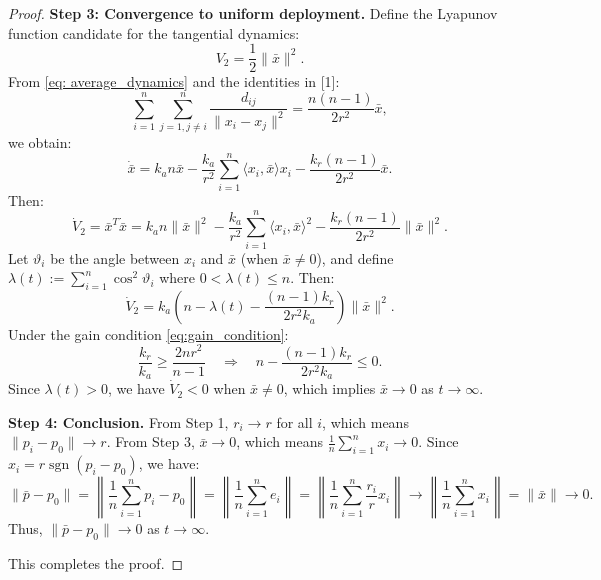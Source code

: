 \documentclass{ctexart}
\DeclareMathOperator{\sgn}{sgn}
\begin{document}
\begin{proof}
\textbf{Step 3: Convergence to uniform deployment.}
Define the Lyapunov function candidate for the tangential dynamics:
\begin{equation}
V_2 = \frac{1}{2} \|\bar{x}\|^2.
\end{equation}
From \eqref{eq: average_dynamics} and the identities in [1]:
\begin{equation}
\sum_{i=1}^{n} \sum_{j=1, j \neq i}^{n} \frac{d_{ij}}{\|x_i - x_j\|^2} = \frac{n(n-1)}{2r^2} \bar{x},
\end{equation}
we obtain:
\begin{equation}
\dot{\bar{x}} = k_a n \bar{x} - \frac{k_a}{r^2} \sum_{i=1}^{n} \langle x_i, \bar{x} \rangle x_i - \frac{k_r(n-1)}{2r^2} \bar{x}.
\end{equation}
Then:
\begin{equation}
\dot{V}_2 = \bar{x}^T \dot{\bar{x}} = k_a n \|\bar{x}\|^2 - \frac{k_a}{r^2} \sum_{i=1}^{n} \langle x_i, \bar{x} \rangle^2 - \frac{k_r(n-1)}{2r^2} \|\bar{x}\|^2.
\end{equation}
Let $\vartheta_i$ be the angle between $x_i$ and $\bar{x}$ (when $\bar{x} \neq 0$), and define $\lambda(t) := \sum_{i=1}^{n} \cos^2 \vartheta_i$ where $0 < \lambda(t) \leq n$.
Then:
\begin{equation}
\dot{V}_2 = k_a \left(n - \lambda(t) - \frac{(n-1)k_r}{2r^2 k_a}\right) \|\bar{x}\|^2.
\end{equation}
Under the gain condition \eqref{eq:gain_condition}:
\begin{equation}
\frac{k_r}{k_a} \geq \frac{2n r^2}{n-1} \quad \Rightarrow \quad n - \frac{(n-1)k_r}{2r^2 k_a} \leq 0.
\end{equation}
Since $\lambda(t) > 0$, we have $\dot{V}_2 < 0$ when $\bar{x} \neq 0$, which implies $\bar{x} \to 0$ as $t \to \infty$.

\textbf{Step 4: Conclusion.}
From Step 1, $r_i \to r$ for all $i$, which means $\|p_i - p_0\| \to r$.
From Step 3, $\bar{x} \to 0$, which means $\frac{1}{n} \sum_{i=1}^{n} x_i \to 0$.
Since $x_i = r \sgn(p_i - p_0)$, we have:
\begin{equation}
\|\bar{p} - p_0\| = \left\| \frac{1}{n} \sum_{i=1}^{n} p_i - p_0 \right\| = \left\| \frac{1}{n} \sum_{i=1}^{n} e_i \right\| = \left\| \frac{1}{n} \sum_{i=1}^{n} \frac{r_i}{r} x_i \right\| \to \left\| \frac{1}{n} \sum_{i=1}^{n} x_i \right\| = \|\bar{x}\| \to 0.
\end{equation}
Thus, $\|\bar{p} - p_0\| \to 0$ as $t \to \infty$.

This completes the proof.
\end{proof}
\end{document}

